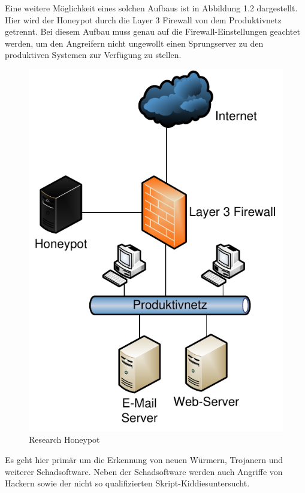 Eine weitere Möglichkeit eines solchen Aufbaus ist in Abbildung 1.2 dargestellt. Hier wird der Honeypot durch die Layer 3 Firewall von dem Produktivnetz getrennt. Bei diesem Aufbau muss genau auf die Firewall-Einstellungen geachtet werden, um den Angreifern nicht ungewollt einen Sprungserver zu den produktiven Systemen zur Verfügung zu stellen.
\\
\begin{figure}[ht]
    \centering\includegraphics[scale=0.6]{Bilder/Research_2.pdf}
  \caption{Research Honeypot}
  \label{hnet:geni}
\end{figure}

Es geht hier primär um die Erkennung von neuen Würmern, Trojanern und weiterer Schadsoftware. Neben der Schadsoftware werden auch Angriffe von Hackern sowie der nicht so qualifizierten \glqq Skript-Kiddies\grqq untersucht.

